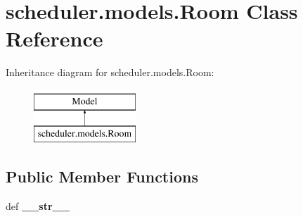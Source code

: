 \hypertarget{classscheduler_1_1models_1_1_room}{\section{scheduler.\-models.\-Room Class Reference}
\label{classscheduler_1_1models_1_1_room}
}
Inheritance diagram for scheduler.\-models.\-Room\-:\begin{figure}[H]
\begin{center}
\leavevmode
\includegraphics[height=2.000000cm]{classscheduler_1_1models_1_1_room}
\end{center}
\end{figure}
\subsection*{Public Member Functions}
\begin{DoxyCompactItemize}
\item 
\hypertarget{classscheduler_1_1models_1_1_room_a63cb85d7e2c2d61c6aa0dc6032c8082c}{def {\bfseries \-\_\-\-\_\-str\-\_\-\-\_\-}}\label{classscheduler_1_1models_1_1_room_a63cb85d7e2c2d61c6aa0dc6032c8082c}

\end{DoxyCompactItemize}
